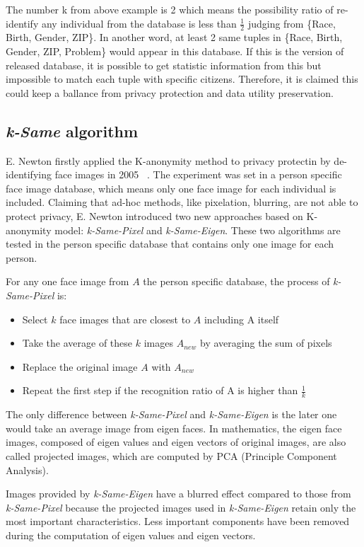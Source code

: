 		The number k from above example is 2 which means the possibility ratio of re-identify any individual from the database is less than $\frac{1}{2}$ judging from \{Race, Birth, Gender, ZIP\}. In another word, at least 2 same tuples in \{Race, Birth, Gender, ZIP, Problem\} would appear in this database. If this is the version of released database, it is possible to get statistic information from this but impossible to match each tuple with specific citizens. Therefore, it is claimed this could keep a ballance from privacy protection and data utility preservation.  
	
	\subsection{\emph{k-Same} algorithm}

	E. Newton firstly applied the K-anonymity method to privacy protectin by de-identifying face images in 2005 ~\cite{Newton05}. The experiment was set in a person specific face image database, which means only one face image for each individual is included. Claiming that ad-hoc methods, like pixelation, blurring, are not able to protect privacy, E. Newton introduced two new approaches based on K-anonymity model: \emph{k-Same-Pixel} and \emph{k-Same-Eigen}. These two algorithms are tested in the person specific database that contains only one image for each person. 

	For any one face image from $A$ the person specific database, the process of \emph{k-Same-Pixel} is:
	\begin{itemize}
		\item Select $k$ face images that are closest to $A$ including A itself
		\item Take the average of these $k$ images $A_{new}$ by averaging the sum of pixels
		\item Replace the original image $A$ with $A_{new}$
		\item Repeat the first step if the recognition ratio of A is higher than $\frac{1}{k}$
	\end{itemize}
	The only difference between \emph{k-Same-Pixel} and \emph{k-Same-Eigen} is the later one would take an average image from eigen faces. In mathematics, the eigen face images, composed of eigen values and eigen vectors of original images, are also called projected images, which are computed by PCA (Principle Component Analysis). 

	Images provided by \emph{k-Same-Eigen} have a blurred effect compared to those from \emph{k-Same-Pixel} because the projected images used in \emph{k-Same-Eigen} retain only the most important characteristics. Less important components have been removed during the computation of eigen values and eigen vectors.

